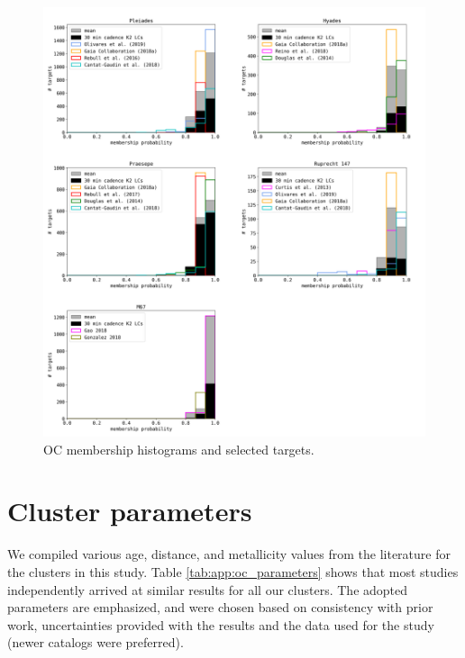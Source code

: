 \documentclass{aa}
\begin{document}
\begin{appendix}
   \begin{figure}
            \includegraphics[width=\hsize]{pics/appendix/membership_histograms.png}
         \caption{OC membership histograms and selected targets.}
          \label{fig:app:memberships}
   \end{figure}

\section{Cluster parameters}
\label{app:cluster_params}
We compiled various age, distance, and metallicity values from the literature for the clusters in this study. Table \ref{tab:app:oc_parameters} shows that most studies independently arrived at similar results for all our clusters. The adopted parameters are emphasized, and were chosen based on consistency with prior work, uncertainties provided with the results and the data used for the study (newer catalogs were preferred). 



\end{appendix}
\end{document}
